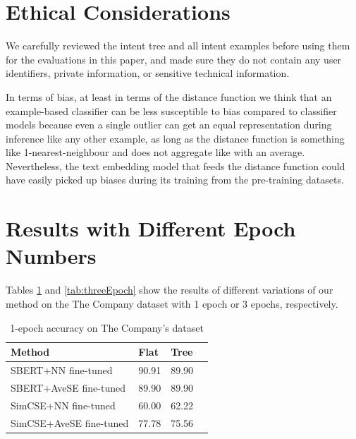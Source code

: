 \documentclass[sigconf, anonymous=true]{acmart}
\begin{document}
\section{Ethical Considerations}
We carefully reviewed the intent tree and all intent examples before using them for the evaluations in this paper, and made sure they do not contain any user identifiers, private information, or sensitive technical information. 

In terms of bias, at least in terms of the distance function we think that an example-based classifier can be less susceptible to bias compared to classifier models because even a single outlier can get an equal representation during inference like any other example, as long as the distance function is something like 1-nearest-neighbour and does not aggregate like with an average. Nevertheless, the text embedding model that feeds the distance function could have easily picked up biases during its training from the pre-training datasets. 





\appendix

\section{Results with Different Epoch Numbers}
\label{sec:Epochs}

Tables \ref{tab:oneEpoch} and \ref{tab:threeEpoch} show the results of different variations of our method on the The Company dataset with 1 epoch or 3 epochs, respectively.

\begin{table}[h]
\setlength{} %
\footnotesize\centering
\begin{tabular}{llll}
\hline \textbf{Method} & \textbf{Flat} & \textbf{Tree} \\
\hline SBERT+NN fine-tuned & 90.91 & 89.90  \\
SBERT+AveSE fine-tuned & 89.90 & 89.90  \\
SimCSE+NN fine-tuned & 60.00 & 62.22  \\
SimCSE+AveSE fine-tuned & 77.78 & 75.56  \\
\hline
\end{tabular}
\caption{1-epoch accuracy on The Company's dataset}
\label{tab:oneEpoch}
\end{table}
\end{document}
